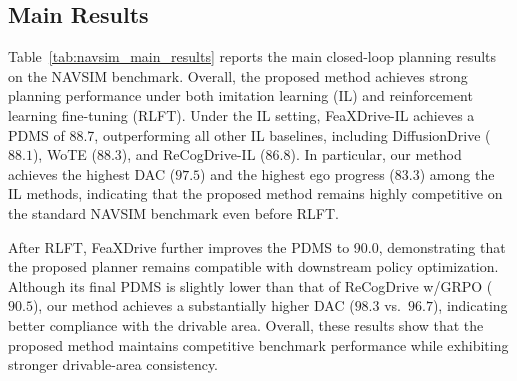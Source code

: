 \documentclass[3p,times,authoryear]{elsarticle}
\begin{document}
\subsection{Main Results}

Table~\ref{tab:navsim_main_results} reports the main closed-loop planning results on the NAVSIM benchmark. Overall, the proposed method achieves strong planning performance under both imitation learning (IL) and reinforcement learning fine-tuning (RLFT). Under the IL setting, FeaXDrive-IL achieves a PDMS of 88.7, outperforming all other IL baselines, including DiffusionDrive (\(88.1\)), WoTE (\(88.3\)), and ReCogDrive-IL (\(86.8\)). In particular, our method achieves the highest DAC (\(97.5\)) and the highest ego progress (\(83.3\)) among the IL methods, indicating that the proposed method remains highly competitive on the standard NAVSIM benchmark even before RLFT.

After RLFT, FeaXDrive further improves the PDMS to 90.0, demonstrating that the proposed planner remains compatible with downstream policy optimization. Although its final PDMS is slightly lower than that of ReCogDrive w/GRPO (\(90.5\)), our method achieves a substantially higher DAC (\(98.3\) vs.\ \(96.7\)), indicating better compliance with the drivable area. Overall, these results show that the proposed method maintains competitive benchmark performance while exhibiting stronger drivable-area consistency.
\end{document}
